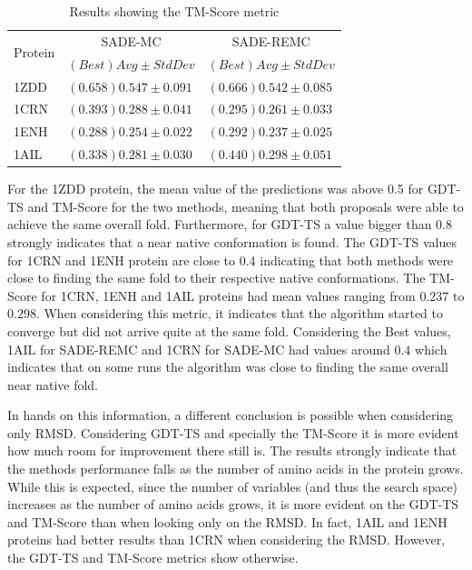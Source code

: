 \begin{table}[ht!]
  \centering
  \begin{tabular}{ l | l | l }
    \hline \hline
\multirow{2}{*}{Protein}& \multicolumn{1}{c|}{SADE-MC} & \multicolumn{1}{c}{SADE-REMC}  \\ \cline{2-3}
                      & $(Best) Avg \pm Std Dev $ & $(Best) Avg \pm Std Dev$  \\ \hline \hline
\multirow{1}{*}{1ZDD} & $(0.658) 0.547 \pm 0.091$ & $(0.666) 0.542 \pm 0.085$ \\ \hline
\multirow{1}{*}{1CRN} & $(0.393) 0.288 \pm 0.041$ & $(0.295) 0.261 \pm 0.033$ \\ \hline
\multirow{1}{*}{1ENH} & $(0.288) 0.254 \pm 0.022$ & $(0.292) 0.237 \pm 0.025$ \\ \hline
\multirow{1}{*}{1AIL} & $(0.338) 0.281 \pm 0.030$ & $(0.440) 0.298 \pm 0.051$ \\
    \hline \hline
  \end{tabular}
  \caption{Results showing the TM-Score metric}
  \label{metrics-tm-score}
\end{table}


For the 1ZDD protein, the mean value of the predictions was above 0.5 for GDT-TS and TM-Score for the two methods, meaning that both proposals were able to achieve the same overall fold. Furthermore, for GDT-TS a value bigger than 0.8 strongly indicates that a near native conformation is found. The GDT-TS values for 1CRN and 1ENH protein are close to 0.4 indicating that both methods were
close to finding the same fold to their respective native conformations. The TM-Score for 1CRN, 1ENH and 1AIL proteins had mean values ranging from $0.237$ to $0.298$. When considering this metric, it indicates that the algorithm started to converge but did not arrive quite at the same fold. Considering the Best values, 1AIL for SADE-REMC and 1CRN for SADE-MC had values around $0.4$ which indicates that on some runs the algorithm was close to finding the same overall near native fold.

In hands on this information, a different conclusion is possible when considering only \ac{RMSD}. Considering GDT-TS and specially the TM-Score it is more evident how much room for improvement there still is. The results strongly indicate that the methods performance falls as the number of amino acids in the protein grows. While this is expected, since the number of variables (and thus the search space) increases as the number of amino acids grows, it is more evident on the GDT-TS and TM-Score than when looking only on the \ac{RMSD}. In fact, 1AIL and 1ENH proteins had better results than 1CRN when considering the \ac{RMSD}. However, the GDT-TS and TM-Score metrics show otherwise.

